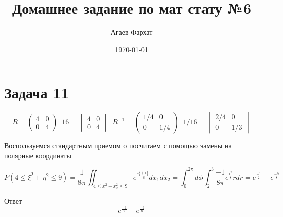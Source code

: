 \documentclass[a4paper, 12pt]{article} %
\author{Агаев Фархат}
\title{Домашнее задание по мат стату №6}
\date{\today}
\begin{document}

\maketitle

\section*{Задача 11}
\[ R = \begin{pmatrix}
    4 & 0\\
    0&  4
  \end{pmatrix} \;
   \;
   16 = \begin{vmatrix}
    4 & 0\\
    0&  4
  \end{vmatrix} \;
   \;
  R^{-1} = \begin{pmatrix}
    1/4 & 0\\
    0&  1/4
  \end{pmatrix}
  \;
   \;
  1/16 = \begin{vmatrix}
    2/4 & 0\\
    0&  1/3
  \end{vmatrix}
  \]

  Воспользуемся стандартным приемом о посчитаем с помощью замены на полярные координаты

  \[P(4 \leq \xi^2 + \eta^2 \leq 9) = \frac{1}{8\pi}\iint_{4 \leq x_1^2 + x_2^2 \leq 9} e ^{\frac{x_1^2 + x_2^2}{-8}}dx_1dx_2 = \int_{0}^{2\pi} d\phi  \int_{2}^{3} \frac{-1}{8\pi} e ^{\frac{r^2}{8}}rdr = e^{\frac{-1}{2}} - e^{\frac{-9}{8}}
  \]

Ответ 
\[e^{\frac{-1}{2}} - e^{\frac{-9}{8}}\]
\end{document}
